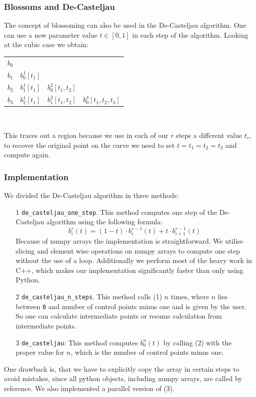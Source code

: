 \subsubsection{Blossoms and De-Casteljau}
The concept of blossoming can also be used in the De-Casteljau algorithm. One can use a new parameter value $t \in [0,1]$ in each step of the algorithm. Looking at the cubic case we obtain:
\begin{center}
  \begin{tabular}{ l c r r}
  $b_0$ &         \\
  $b_1$ & $b_0^1[t_1]$ &      \\
  $b_2$ & $b_1^1[t_1]$ & $b_0^2[t_1, t_2]$    \\
  $b_3$ & $b_2^1[t_1]$ & $b_1^2[t_1, t_2]$ & $b_0^3[t_1, t_2, t_3]$\\
\end{tabular}
\\
\end{center}
This traces out a region because we use in each of our $r$ steps a different value $t_r$, to recover the original point on the curve we need to set $t = t_1 = t_2 = t_3$ and compute again. 

\subsubsection{Implementation}
We divided the De-Casteljau algorithm in three methods:
\begin{enumerate}
    \item[1] \texttt{de\_casteljau\_one\_step}. This method computes one step of the De-Casteljau algorithm using the following formula:
    \[b_i^r(t) = (1-t) \cdot b_i^{r-1}(t) + t \cdot b_{i+1}^{r-1}(t)\]
    Because of numpy arrays the implementation is straightforward. We utilise slicing and element wise operations on numpy arrays to compute one step without the use of a loop. Additionally we perform most of the heavy work in C++, which makes our implementation significantly faster than only using Python.
    \item[2] \texttt{de\_casteljau\_n\_steps}. This method calls (1) $n$ times, where $n$ lies between \texttt{0} and number of control points minus one and is given by the user. So one can calculate intermediate points or resume calculation from intermediate points.
    \item[3] \texttt{de\_casteljau}: This method computes $b_0^n(t)$ by calling (2) with the proper value for $n$, which is the number of control points minus one.
\end{enumerate}
One drawback is, that we have to explicitly copy the array in certain steps to avoid mistakes, since all python objects, including numpy arrays, are called by reference. We also implemented a parallel version of (3). \\

